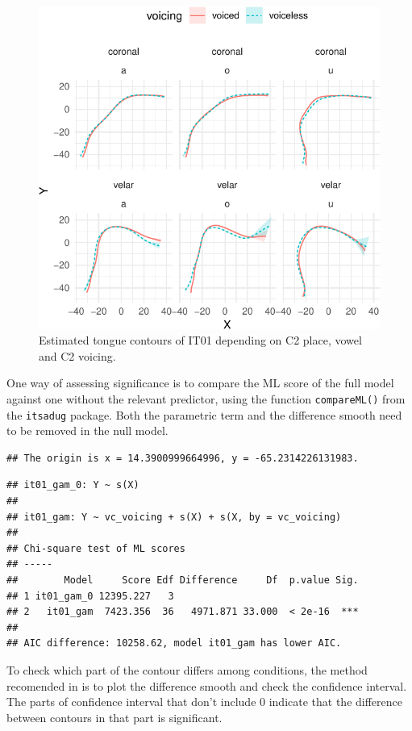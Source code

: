 \documentclass[12pt,]{article}
\begin{document}
\begin{figure}
\includegraphics[width=\linewidth]{2018-polar-gam_files/figure-latex/it01-gam-plot-1} \caption{Estimated tongue contours of IT01 depending on C2 place, vowel and C2 voicing.}\label{f:it01-gam-plot}
\end{figure}

One way of assessing significance is to compare the ML score of the full
model against one without the relevant predictor, using the function
\texttt{compareML()} from the \texttt{itsadug} package. Both the
parametric term and the difference smooth need to be removed in the null
model.

\begin{verbatim}
## The origin is x = 14.3900999664996, y = -65.2314226131983.
\end{verbatim}

\begin{verbatim}
## it01_gam_0: Y ~ s(X)
## 
## it01_gam: Y ~ vc_voicing + s(X) + s(X, by = vc_voicing)
## 
## Chi-square test of ML scores
## -----
##        Model     Score Edf Difference     Df  p.value Sig.
## 1 it01_gam_0 12395.227   3                                
## 2   it01_gam  7423.356  36   4971.871 33.000  < 2e-16  ***
## 
## AIC difference: 10258.62, model it01_gam has lower AIC.
\end{verbatim}

To check which part of the contour differs among conditions, the method
recomended in \citet{soskuthy2017} is to plot the difference smooth and
check the confidence interval. The parts of confidence interval that
don't include 0 indicate that the difference between contours in that
part is significant.
\end{document}

